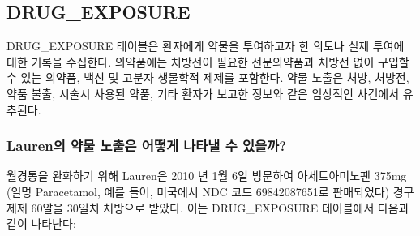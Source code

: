 \documentclass[11pt]{book}
\theoremstyle{definition}
\theoremstyle{definition}
\theoremstyle{definition}
\theoremstyle{remark}
\begin{document}
\subsection{DRUG\_EXPOSURE}\label{drugExposure}

DRUG\_EXPOSURE 테이블은 환자에게 약물을 투여하고자 한 의도나 실제 투여에
대한 기록을 수집한다. 의약품에는 처방전이 필요한 전문의약품과 처방전
없이 구입할 수 있는 의약품, 백신 및 고분자 생물학적 제제를 포함한다.
약물 노출은 처방, 처방전, 약품 불출, 시술시 사용된 약품, 기타 환자가
보고한 정보와 같은 임상적인 사건에서 유추된다.

\subsubsection*{Lauren의 약물 노출은 어떻게 나타낼 수
있을까?}\label{lauren------}

월경통을 완화하기 위해 Lauren은 2010 년 1월 6일 방문하여 아세트아미노펜
375mg (일명 Paracetamol, 예를 들어, 미국에서 NDC 코드 69842087651로
판매되었다) 경구 제제 60알을 30일치 처방으로 받았다. 이는 DRUG\_EXPOSURE
테이블에서 다음과 같이 나타난다:
\end{document}

